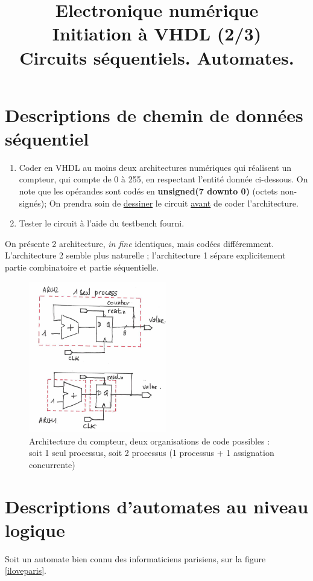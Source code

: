\documentclass[a4paper,11pt]{article}
\title{{\Huge Electronique numérique}\\Initiation à VHDL (2/3)\\Circuits séquentiels. Automates.\\ \color{red}{CORRECTIONS}}
\date{}
\begin{document}
\maketitle

\section{Descriptions de chemin de données séquentiel}

\begin{enumerate}
  \item Coder en VHDL au moins deux architectures numériques qui
  réalisent un compteur, qui compte de 0 à 255, en respectant l'entité donnée ci-dessous.
  On note que les opérandes sont codés en \textbf{unsigned(7 downto 0)} (octets non-signés);
  On prendra soin de \underline{dessiner} le circuit \underline{avant} de coder l'architecture.
  \item Tester le circuit à l'aide du testbench fourni.
\end{enumerate}

On présente 2 architecture, {\it in fine} identiques, mais codées différemment. L'architecture 2 semble
plus naturelle ; l'architecture 1 sépare explicitement partie combinatoire et partie séquentielle.
\begin{figure}
  \centering
  \includegraphics[width=6cm]{./compteur.png}
  \caption{Architecture du compteur, deux organisations de code possibles : soit 1 seul processus, soit 2 processus (1 processus + 1 assignation concurrente)}
  \label{compteur}
\end{figure}

\lstset{inputencoding=utf8}


\section{Descriptions d'automates au niveau logique}
Soit un automate bien connu des informaticiens parisiens, sur la figure \ref{iloveparis}.
\end{document}
